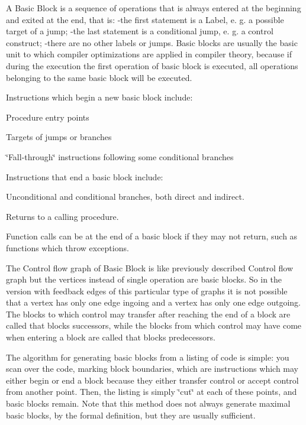 A Basic Block is a sequence of operations that is always entered at the beginning and exited at the end, that is\+: -\/the first statement is a Label, e. g. a possible target of a jump; -\/the last statement is a conditional jump, e. g. a control construct; -\/there are no other labels or jumps. Basic blocks are usually the basic unit to which compiler optimizations are applied in compiler theory, because if during the execution the first operation of basic block is executed, all operations belonging to the same basic block will be executed.

Instructions which begin a new basic block include\+:
\begin{DoxyItemize}
\item Procedure entry points
\item Targets of jumps or branches
\item \char`\"{}\+Fall-\/through\char`\"{} instructions following some conditional branches
\end{DoxyItemize}

Instructions that end a basic block include\+:
\begin{DoxyItemize}
\item Unconditional and conditional branches, both direct and indirect.
\item Returns to a calling procedure.
\item Function calls can be at the end of a basic block if they may not return, such as functions which throw exceptions.
\end{DoxyItemize}

The Control flow graph of Basic Block is like previously described Control flow graph but the vertices instead of single operation are basic blocks. So in the version with feedback edges of this particular type of graphs it is not possible that a vertex has only one edge ingoing and a vertex has only one edge outgoing. The blocks to which control may transfer after reaching the end of a block are called that block\textquotesingle{}s successors, while the blocks from which control may have come when entering a block are called that block\textquotesingle{}s predecessors.

The algorithm for generating basic blocks from a listing of code is simple\+: you scan over the code, marking block boundaries, which are instructions which may either begin or end a block because they either transfer control or accept control from another point. Then, the listing is simply \char`\"{}cut\char`\"{} at each of these points, and basic blocks remain. Note that this method does not always generate maximal basic blocks, by the formal definition, but they are usually sufficient.

